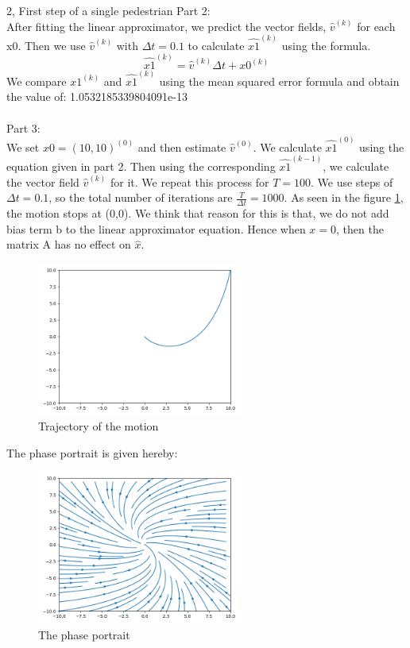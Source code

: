 \documentclass[10pt,a4paper]{article}
\begin{document}
\begin{task}{2, First step of a single pedestrian}
Part 2: \\
After fitting the linear approximator, we predict the vector fields, $\hat{v}^{(k)}$ for each x0. Then we use $\hat{v}^{(k)}$ with $\Delta t = 0.1$ to calculate $\hat{x1}^{(k)}$ using the formula.
\begin{equation*}
\hat{x1}^{(k)} = \hat{v}^{(k)}\Delta t + x0^{(k)}
\end{equation*}
We compare $x1^{(k)}$ and $\hat{x1}^{(k)}$ using the mean squared error formula and obtain the value of: 1.0532185339804091e-13 \\\\
Part 3: \\
We set $x0=(10, 10)^{(0)}$ and then estimate $\hat{v}^{(0)}$. We calculate $\hat{x1}^{(0)}$ using the equation given in part 2. Then using the corresponding $\hat{x1}^{(k-1)}$, we calculate the vector field $\hat{v}^{(k)}$ for it. We repeat this process for $T = 100$. We use steps of $\Delta t = 0.1$, so the total number of iterations are $\frac{T}{\Delta t} = 1000$. 
As seen in the figure \ref{fig:task2_3}, the motion stops at (0,0). We think that reason for this is that, we do not add bias term b to the linear approximator equation. Hence when $x=0$, then the matrix A has no effect on $\hat{x}$.

\begin{figure}[H]
\centering
\includegraphics[width=0.6\textwidth]{../plots/task2_part3.png}
\caption{Trajectory of the motion}
\label{fig:task2_3}
\end{figure}

The phase portrait is given hereby:
\begin{figure}[H]
\centering
\includegraphics[width=0.6\textwidth]{../plots/task2_part3_phase.png}
\caption{The phase portrait}
\label{fig:task2_3_phase}
\end{figure}

\end{task}
\end{document}
